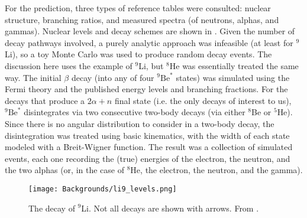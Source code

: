 \documentclass[../thesis.tex]{subfiles}
\begin{document}
\begin{comment}
An extraction of the spectrum from Daya Bay data was performed by Marshall in [XXX]. The approach takes advantage of the fact that \LiHe\ are essentially the only IBD-like events that are correlated with muons on the 100~ms timescale. A \LiHe-enriched sample was obtained by taking IBD-like events within 2---200~ms of a ``shower'' muon, here defined as one producing at least $2\times10^5$ photoelectrons. This sample contained various muon-uncorrelated ``backgrounds'', such as true IBDs and accidentals. In order to remove this contamination, a \LiHe-depleted sample was obtained by looking for IBD candidates with no preceding shower muons within 1.5~s. Before subtracting the two spectra, an appropriate normalization for the depleted sample had to be determined. This was done by performing the time-to-last-muon fit for the enriched sample, which indicated the number of true \LiHe\ events in the sample, in turn implying the number of non-\LiHe\ events. The depleted sample was thus normalized to this latter count, and the subtraction was performed, giving the results shown in Fig.~XXX.
\end{comment}

For the prediction, three types of reference tables were consulted: nuclear structure, branching ratios, and measured spectra (of neutrons, alphas, and gammas). Nuclear levels and decay schemes are shown in . Given the number of decay pathways involved, a purely analytic approach was infeasible (at least for $^9$Li), so a toy Monte Carlo was used to produce random decay events. The discussion here uses the example of $^9$Li, but $^8$He was essentially treated the same way. The initial $\beta$ decay (into any of four $^9\mathrm{Be}^*$ states) was simulated using the Fermi theory \cite{Fermi1934TentativoDU} and the published energy levels and branching fractions. For the decays that produce a $2\alpha+n$ final state (i.e. the only decays of interest to us), $^9\mathrm{Be}^*$ disintegrates via two consecutive two-body decays (via either $^8$Be or $^5$He). Since there is no angular distribution to consider in a two-body decay, the disintegration was treated using basic kinematics, with the width of each state modeled with a Breit-Wigner function. The result was a collection of simulated events, each one recording the (true) energies of the electron, the neutron, and the two alphas (or, in the case of $^8$He, the electron, the neutron, and the gamma).

\begin{figure}[h]
  \texttt{[image: Backgrounds/li9\_levels.png]}
  \caption{The decay of $^9$Li. Not all decays are shown with arrows. From \cite{pedroLi9Spec2}.}
  \label{fig:li9_levels}
\end{figure}
\end{document}
